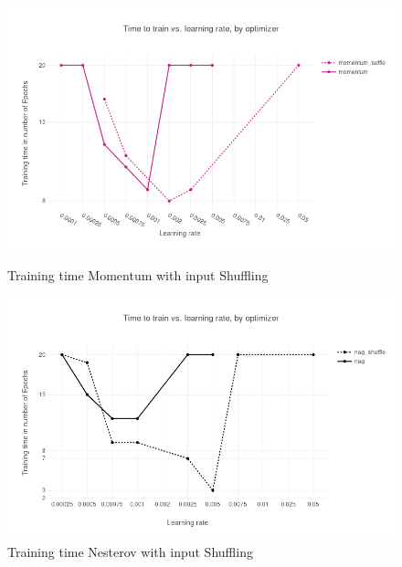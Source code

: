 \begin{figure}[h]
\centering
\begin{minipage}{.5\textwidth}
  \centering
      \includegraphics[scale=0.3]{images/results_mom_shuffle} 
    \caption{Training time  Momentum with input Shuffling}
    \label{fig:results_mom}
  \label{fig:test1}
\end{minipage}%
\begin{minipage}{.5\textwidth}
  \centering
    \includegraphics[scale=0.3]{images/results_nag_shuffle} 
    \caption{Training time  Nesterov with input Shuffling}
    \label{fig:results_nag}
\end{minipage}
\end{figure}

